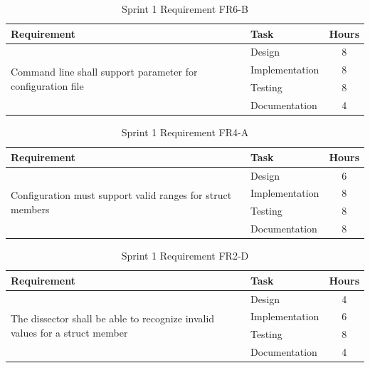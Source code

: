 \begin{table}[!ht] \small \center
\caption{Sprint 1 Requirement FR6-B\label{tab:sp1_req7b}}
\begin{tabular}{l l c}
	\toprule
	Requirement & Task & Hours \\
	\midrule
	\multirow{4}{5cm}{Command line shall support parameter for configuration file} & Design & 8 \\
	& Implementation & 8 \\
	& Testing & 8 \\
	& Documentation & 4 \\
	\bottomrule
\end{tabular}
\end{table}

\begin{table}[!ht] \small \center
\caption{Sprint 1 Requirement FR4-A\label{tab:sp1_req4a}}
\begin{tabular}{l l c}
	\toprule
	Requirement & Task & Hours \\
	\midrule
	\multirow{4}{5cm}{Configuration must support valid ranges for \gls{struct} \glspl{member}} & Design & 6 \\
	& Implementation & 8 \\
	& Testing & 8 \\
	& Documentation & 8 \\
	\bottomrule
\end{tabular}
\end{table}

\begin{table}[!ht] \small \center
\caption{Sprint 1 Requirement FR2-D\label{tab:sp1_req2d}}
\begin{tabular}{l l c}
	\toprule
	Requirement & Task & Hours \\
	\midrule
	\multirow{4}{5cm}{The \gls{dissector} shall be able to recognize invalid values for a \gls{struct} \gls{member}} & Design & 4 \\
	& Implementation & 6 \\
	& Testing & 8 \\
	& Documentation & 4 \\
	\bottomrule
\end{tabular}
\end{table}

